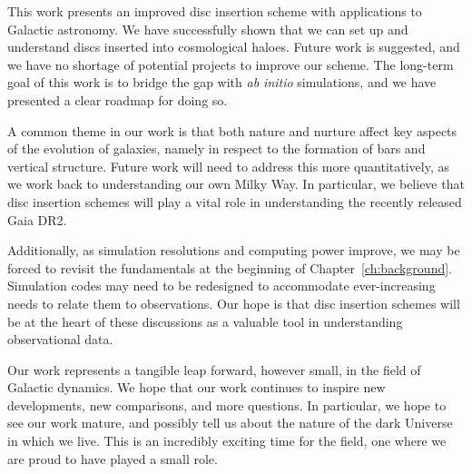 
This work presents an improved disc insertion scheme with applications to Galactic astronomy. We have successfully shown that we can set up and understand discs inserted into cosmological haloes. Future work is suggested, and we have no shortage of potential projects to improve our scheme. The long-term goal of this work is to bridge the gap with \textit{ab initio} simulations, and we have presented a clear roadmap for doing so.


A common theme in our work is that both nature and nurture affect key aspects of the evolution of galaxies, namely in respect to the formation of bars and vertical structure. Future work will need to address this more quantitatively, as we work back to understanding our own Milky Way. In particular, we believe that disc insertion schemes will play a vital role in understanding the recently released Gaia DR2.

Additionally, as simulation resolutions and computing power improve, we may be forced to revisit the fundamentals at the beginning of Chapter~\ref{ch:background}. Simulation codes may need to be redesigned to accommodate ever-increasing needs to relate them to observations. Our hope is that disc insertion schemes will be at the heart of these discussions as a valuable tool in understanding observational data.

Our work represents a tangible leap forward, however small, in the field of Galactic dynamics.  We hope that our work continues to inspire new developments, new comparisons, and more questions. In particular, we hope to see our work mature, and possibly tell us about the nature of the dark Universe in which we live. This is an incredibly exciting time for the field, one where we are proud to have played a small role.




